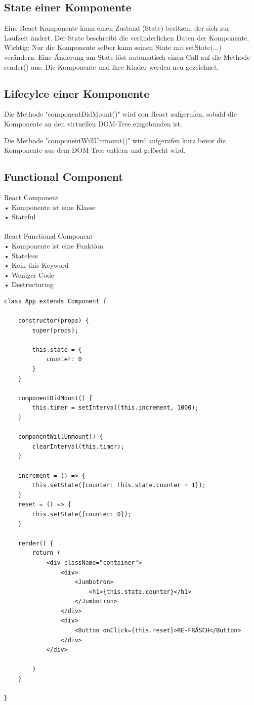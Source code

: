 \subsection{State einer Komponente}

Eine React-Komponente kann einen Zustand (State) besitzen, der sich zur Laufzeit ändert. Der State beschreibt die veränderlichen Daten der Komponente. Wichtig: Nur die Komponente selber kann seinen State mit setState(...) verändern. Eine Änderung am State löst automatisch einen Call auf die Methode render() aus. Die Komponente und ihre Kinder werden neu gezeichnet.

\subsection{Lifecylce einer Komponente}
Die Methode "componentDidMount()" wird con React aufgerufen, sobald die Komponente an den virtuellen DOM-Tree eingebunden ist.

Die Methode "componentWillUnmount()" wird aufgerufen kurz bevor die Komponente aus dem DOM-Tree entfern und gelöscht wird.

\subsection{Functional Component}
React Component\\
• Komponente ist eine Klasse\\
• Stateful\\
\\
React Functional Component\\
• Komponente ist eine Funktion\\
• Stateless\\
• Kein this Keyword\\
• Weniger Code\\
• Destructuring\\

\begin{verbatim}
class App extends Component {

    constructor(props) {
        super(props);

        this.state = {
            counter: 0
        }
    }

    componentDidMount() {
        this.timer = setInterval(this.increment, 1000);
    }

    componentWillUnmount() {
        clearInterval(this.timer);
    }

    increment = () => {
        this.setState({counter: this.state.counter + 1});
    }
    reset = () => {
        this.setState({counter: 0});
    }

    render() {
        return (
            <div className="container">
                <div>
                    <Jumbotron>
                        <h1>{this.state.counter}</h1>
                    </Jumbotron>
                </div>
                <div>
                    <Button onClick={this.reset}>RE-FRÄSCH</Button>
                </div>
            </div>

        )
    }

}
\end{verbatim}

